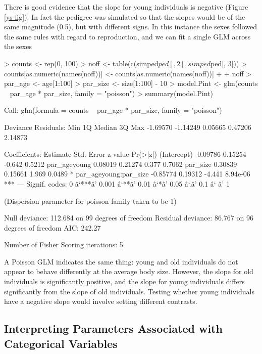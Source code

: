 \documentclass{article}
\begin{document}
There is good evidence that the slope for young individuals is negative (Figure \ref{ys-fig}).  In fact the pedigree was simulated so that the slopes would be of the same magnitude (0.5), but with different signs. In this instance the sexes followed the same rules with regard to reproduction, and we can fit a single GLM across the sexes

\begin{Schunk}
\begin{Sinput}
> counts <- rep(0, 100)
> noff <- table(c(simped$ped[, 2], simped$ped[, 3]))
> counts[as.numeric(names(noff))] <- counts[as.numeric(names(noff))] + 
+     noff
> par_age <- age[1:100]
> par_size <- size[1:100] - 10
> model.Pint <- glm(counts ~ par_age * par_size, family = "poisson")
> summary(model.Pint)
\end{Sinput}
\begin{Soutput}
Call:
glm(formula = counts ~ par_age * par_size, family = "poisson")

Deviance Residuals: 
     Min        1Q    Median        3Q       Max  
-1.69570  -1.14249   0.05665   0.47206   2.14873  

Coefficients:
                      Estimate Std. Error z value Pr(>|z|)    
(Intercept)           -0.09786    0.15254  -0.642   0.5212    
par_ageyoung           0.08019    0.21274   0.377   0.7062    
par_size               0.30839    0.15661   1.969   0.0489 *  
par_ageyoung:par_size -0.85774    0.19312  -4.441 8.94e-06 ***
---
Signif. codes:  0 â`***â' 0.001 â`**â' 0.01 â`*â' 0.05 â`.â' 0.1 â` â' 1 

(Dispersion parameter for poisson family taken to be 1)

    Null deviance: 112.684  on 99  degrees of freedom
Residual deviance:  86.767  on 96  degrees of freedom
AIC: 242.27

Number of Fisher Scoring iterations: 5
\end{Soutput}
\end{Schunk}

A Poisson GLM indicates the same thing: young and old individuals do not appear to behave differently at the average body size.  However, the slope for old individuals is significantly positive, and the slope for young individuals differs significantly from the slope of old individuals. Testing whether young individuals have a negative slope would involve setting different contrasts. 

\subsection{Interpreting Parameters Associated with Categorical Variables}
\end{document}
